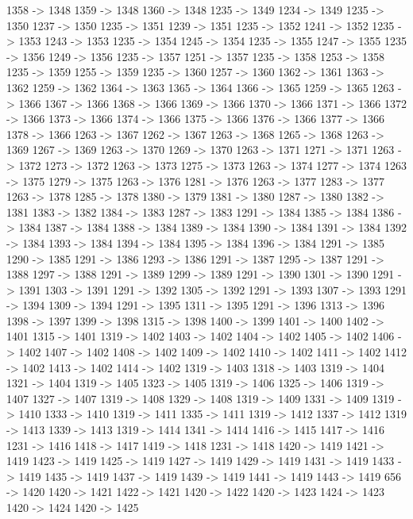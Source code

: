 {	1358 -> 1348
	1359 -> 1348
	1360 -> 1348
	1235 -> 1349
	1234 -> 1349
	1235 -> 1350
	1237 -> 1350
	1235 -> 1351
	1239 -> 1351
	1235 -> 1352
	1241 -> 1352
	1235 -> 1353
	1243 -> 1353
	1235 -> 1354
	1245 -> 1354
	1235 -> 1355
	1247 -> 1355
	1235 -> 1356
	1249 -> 1356
	1235 -> 1357
	1251 -> 1357
	1235 -> 1358
	1253 -> 1358
	1235 -> 1359
	1255 -> 1359
	1235 -> 1360
	1257 -> 1360
	1362 -> 1361
	1363 -> 1362
	1259 -> 1362
	1364 -> 1363
	1365 -> 1364
	1366 -> 1365
	1259 -> 1365
	1263 -> 1366
	1367 -> 1366
	1368 -> 1366
	1369 -> 1366
	1370 -> 1366
	1371 -> 1366
	1372 -> 1366
	1373 -> 1366
	1374 -> 1366
	1375 -> 1366
	1376 -> 1366
	1377 -> 1366
	1378 -> 1366
	1263 -> 1367
	1262 -> 1367
	1263 -> 1368
	1265 -> 1368
	1263 -> 1369
	1267 -> 1369
	1263 -> 1370
	1269 -> 1370
	1263 -> 1371
	1271 -> 1371
	1263 -> 1372
	1273 -> 1372
	1263 -> 1373
	1275 -> 1373
	1263 -> 1374
	1277 -> 1374
	1263 -> 1375
	1279 -> 1375
	1263 -> 1376
	1281 -> 1376
	1263 -> 1377
	1283 -> 1377
	1263 -> 1378
	1285 -> 1378
	1380 -> 1379
	1381 -> 1380
	1287 -> 1380
	1382 -> 1381
	1383 -> 1382
	1384 -> 1383
	1287 -> 1383
	1291 -> 1384
	1385 -> 1384
	1386 -> 1384
	1387 -> 1384
	1388 -> 1384
	1389 -> 1384
	1390 -> 1384
	1391 -> 1384
	1392 -> 1384
	1393 -> 1384
	1394 -> 1384
	1395 -> 1384
	1396 -> 1384
	1291 -> 1385
	1290 -> 1385
	1291 -> 1386
	1293 -> 1386
	1291 -> 1387
	1295 -> 1387
	1291 -> 1388
	1297 -> 1388
	1291 -> 1389
	1299 -> 1389
	1291 -> 1390
	1301 -> 1390
	1291 -> 1391
	1303 -> 1391
	1291 -> 1392
	1305 -> 1392
	1291 -> 1393
	1307 -> 1393
	1291 -> 1394
	1309 -> 1394
	1291 -> 1395
	1311 -> 1395
	1291 -> 1396
	1313 -> 1396
	1398 -> 1397
	1399 -> 1398
	1315 -> 1398
	1400 -> 1399
	1401 -> 1400
	1402 -> 1401
	1315 -> 1401
	1319 -> 1402
	1403 -> 1402
	1404 -> 1402
	1405 -> 1402
	1406 -> 1402
	1407 -> 1402
	1408 -> 1402
	1409 -> 1402
	1410 -> 1402
	1411 -> 1402
	1412 -> 1402
	1413 -> 1402
	1414 -> 1402
	1319 -> 1403
	1318 -> 1403
	1319 -> 1404
	1321 -> 1404
	1319 -> 1405
	1323 -> 1405
	1319 -> 1406
	1325 -> 1406
	1319 -> 1407
	1327 -> 1407
	1319 -> 1408
	1329 -> 1408
	1319 -> 1409
	1331 -> 1409
	1319 -> 1410
	1333 -> 1410
	1319 -> 1411
	1335 -> 1411
	1319 -> 1412
	1337 -> 1412
	1319 -> 1413
	1339 -> 1413
	1319 -> 1414
	1341 -> 1414
	1416 -> 1415
	1417 -> 1416
	1231 -> 1416
	1418 -> 1417
	1419 -> 1418
	1231 -> 1418
	1420 -> 1419
	1421 -> 1419
	1423 -> 1419
	1425 -> 1419
	1427 -> 1419
	1429 -> 1419
	1431 -> 1419
	1433 -> 1419
	1435 -> 1419
	1437 -> 1419
	1439 -> 1419
	1441 -> 1419
	1443 -> 1419
	656 -> 1420
	1420 -> 1421
	1422 -> 1421
	1420 -> 1422
	1420 -> 1423
	1424 -> 1423
	1420 -> 1424
	1420 -> 1425
}

